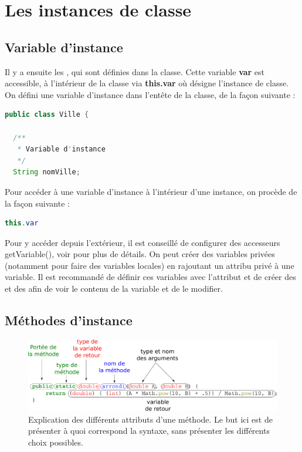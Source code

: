 \documentclass[a4paper,twoside]{article}
\begin{document}
\section{Les instances de classe}
\subsection{Variable d'instance}
Il y a ensuite les , qui sont définies dans la classe. Cette variable \textbf{var} est accessible, à l'intérieur de la classe via \textbf{this.var} où  désigne l'instance de classe. On défini une variable d'instance dans l'entête de la classe, de la façon suivante :
\begin{lstlisting}[language=java]
public class Ville {
 
  /**
   * Variable d'instance
   */
  String nomVille;
\end{lstlisting}

Pour accéder à une variable d'instance à l'intérieur d'une instance, on procède de la façon suivante :
\begin{lstlisting}[language=java]
this.var
\end{lstlisting}

Pour y accéder depuis l'extérieur, il est conseillé de configurer des accesseurs \og getVariable()\fg, voir  pour plus de détails. On peut créer des variables privées (notamment pour faire des variables locales) en rajoutant un attribu privé à une variable. Il est recommandé de définir ces variables avec l'attribut  et de créer des  et des  afin de voir le contenu de la variable et de le modifier.

\subsection{Méthodes d'instance}\label{sec:methode_instance}

\begin{figure}[htb]
\centering
\includegraphics[width=\linewidth]{figures/method_scheme.pdf}
\caption{Explication des différents attributs d'une méthode. Le but ici est de présenter à quoi correspond la syntaxe, sans présenter les différents choix possibles.}
\end{figure}
\end{document}
